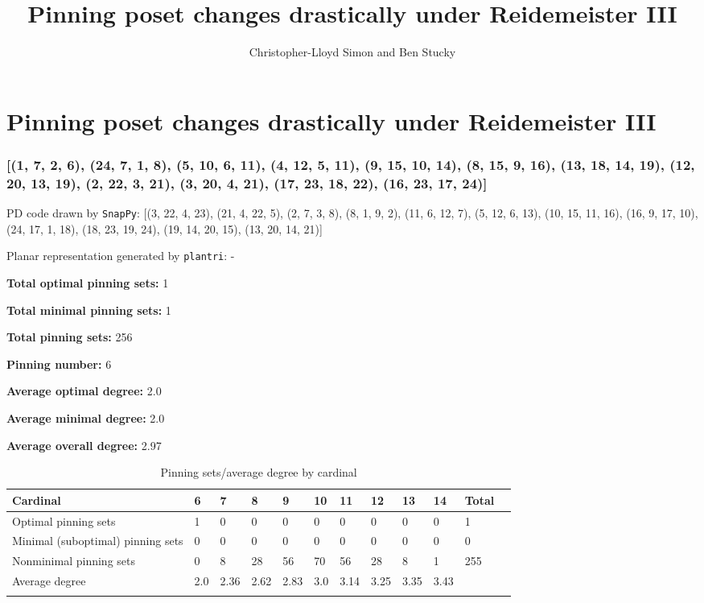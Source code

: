 \documentclass{article}%
\title{Pinning poset changes drastically under Reidemeister III}
\author{Christopher-Lloyd Simon and Ben Stucky}
\begin{document}
%

\section{Pinning poset changes drastically under Reidemeister III}

\subsubsection{[(1, 7, 2, 6), (24, 7, 1, 8), (5, 10, 6, 11), (4, 12, 5, 11), (9, 15, 10, 14), (8, 15, 9, 16), (13, 18, 14, 19), (12, 20, 13, 19), (2, 22, 3, 21), (3, 20, 4, 21), (17, 23, 18, 22), (16, 23, 17, 24)]}

{\small\noindent PD code drawn by \texttt{SnapPy}: [(3, 22, 4, 23), (21, 4, 22, 5), (2, 7, 3, 8), (8, 1, 9, 2), (11, 6, 12, 7), (5, 12, 6, 13), (10, 15, 11, 16), (16, 9, 17, 10), (24, 17, 1, 18), (18, 23, 19, 24), (19, 14, 20, 15), (13, 20, 14, 21)]}

{\small\noindent Planar representation generated by \texttt{plantri}: -}

\begin{multicols}{2}
{\normalsize \noindent\textbf{Total optimal pinning sets:} 1

\noindent\textbf{Total minimal pinning sets:} 1

\noindent\textbf{Total pinning sets:} 256

\noindent\textbf{Pinning number:} 6

}
\columnbreak

{\normalsize \noindent\textbf{Average optimal degree:} 2.0

\noindent\textbf{Average minimal degree:} 2.0

\noindent\textbf{Average overall degree:} 2.97

}
\end{multicols}

\begin{table}[ht]
	\caption{Pinning sets/average degree by cardinal}
	\centering
	\renewcommand{\arraystretch}{1.5}
	\begin{tabularx}{\textwidth}{lXXXXXXXXXXX}
		\toprule
			Cardinal & 6 & 7 & 8 & 9 & 10 & 11 & 12 & 13 & 14 & Total\\
			\hline
			Optimal pinning sets & 1 & 0 & 0 & 0 & 0 & 0 & 0 & 0 & 0 & 1 \\
			Minimal (suboptimal) pinning sets & 0 & 0 & 0 & 0 & 0 & 0 & 0 & 0 & 0 & 0 \\
			Nonminimal pinning sets & 0 & 8 & 28 & 56 & 70 & 56 & 28 & 8 & 1 & 255 \\
			Average degree & 2.0 & 2.36 & 2.62 & 2.83 & 3.0 & 3.14 & 3.25 & 3.35 & 3.43 &  \\
		\bottomrule \\ 
	\end{tabularx}
\end{table}
\end{document}
